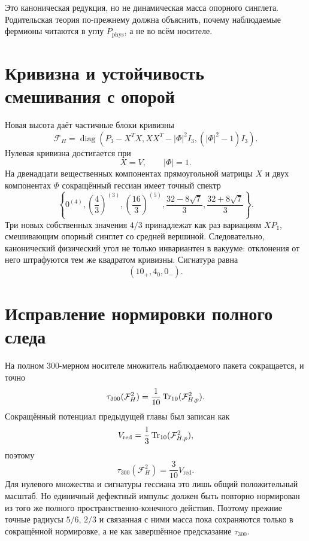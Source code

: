 Это каноническая редукция, но не динамическая масса опорного синглета.
Родительская теория по-прежнему должна объяснить, почему наблюдаемые
фермионы читаются в углу $P_{\mathrm{phys}}$, а не во всём носителе.

\section{Кривизна и устойчивость смешивания с опорой}

Новая высота даёт частичные блоки кривизны
\begin{equation}
 \mathcal F_H=
 \operatorname{diag}\left(
 P_3-X^TX,
 XX^T-|\Phi|^2I_3,
 (|\Phi|^2-1)I_3
 \right).
 \label{eq:v5-affine-curvature-blocks}
\end{equation}
Нулевая кривизна достигается при
\begin{equation}
 X=V,
 \qquad |\Phi|=1.
\end{equation}
На двенадцати вещественных компонентах прямоугольной матрицы $X$ и двух
компонентах $\Phi$ сокращённый гессиан имеет точный спектр
\begin{equation}
 \left\{
 0^{(4)},
 \left(\frac43\right)^{(3)},
 \left(\frac{16}3\right)^{(5)},
 \frac{32-8\sqrt7}{3},
 \frac{32+8\sqrt7}{3}
 \right\}.
 \label{eq:v5-affine-hessian}
\end{equation}
Три новых собственных значения $4/3$ принадлежат как раз вариациям
$XP_1$, смешивающим опорный синглет со средней вершиной. Следовательно,
канонический физический угол не только инвариантен в вакууме: отклонения от
него штрафуются тем же квадратом кривизны. Сигнатура равна
\begin{equation}
 (10_+,4_0,0_-).
\end{equation}

\section{Исправление нормировки полного следа}

На полном 300-мерном носителе множитель наблюдаемого пакета сокращается, и
точно
\begin{equation}
 \tau_{300}(\mathcal F_H^2)
 =\frac1{10}\operatorname{Tr}_{10}(\mathcal F_{H,p}^2).
 \label{eq:v5-affine-parent-trace}
\end{equation}
Сокращённый потенциал предыдущей главы был записан как
\begin{equation}
 V_{\mathrm{red}}
 =\frac13\operatorname{Tr}_{10}(\mathcal F_{H,p}^2),
\end{equation}
поэтому
\begin{equation}
 \boxed{
 \tau_{300}(\mathcal F_H^2)=\frac3{10}V_{\mathrm{red}}.
 }
 \label{eq:v5-affine-trace-scale}
\end{equation}
Для нулевого множества и сигнатуры гессиана это лишь общий положительный
масштаб. Но единичный дефектный импульс должен быть повторно нормирован из
того же полного пространственно-конечного действия. Поэтому прежние
точные радиусы $5/6$, $2/3$ и связанная с ними масса пока сохраняются
только в сокращённой нормировке, а не как завершённое предсказание
$\tau_{300}$.

